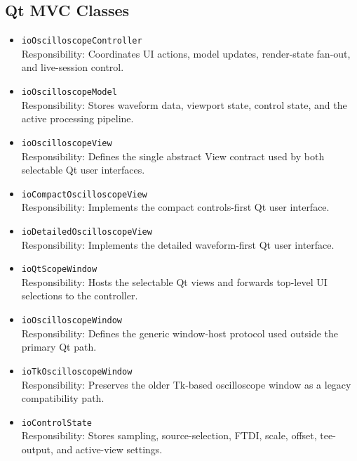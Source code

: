     \subsection{Qt MVC Classes}
    \begin{itemize}
        \item \texttt{ioOscilloscopeController} \\
        Responsibility: Coordinates UI actions, model updates, render-state fan-out, and live-session control.

        \item \texttt{ioOscilloscopeModel} \\
        Responsibility: Stores waveform data, viewport state, control state, and the active processing pipeline.

        \item \texttt{ioOscilloscopeView} \\
        Responsibility: Defines the single abstract View contract used by both selectable Qt user interfaces.

        \item \texttt{ioCompactOscilloscopeView} \\
        Responsibility: Implements the compact controls-first Qt user interface.

        \item \texttt{ioDetailedOscilloscopeView} \\
        Responsibility: Implements the detailed waveform-first Qt user interface.

        \item \texttt{ioQtScopeWindow} \\
        Responsibility: Hosts the selectable Qt views and forwards top-level UI selections to the controller.

        \item \texttt{ioOscilloscopeWindow} \\
        Responsibility: Defines the generic window-host protocol used outside the primary Qt path.

        \item \texttt{ioTkOscilloscopeWindow} \\
        Responsibility: Preserves the older Tk-based oscilloscope window as a legacy compatibility path.

        \item \texttt{ioControlState} \\
        Responsibility: Stores sampling, source-selection, FTDI, scale, offset, tee-output, and active-view settings.


\end{itemize}
